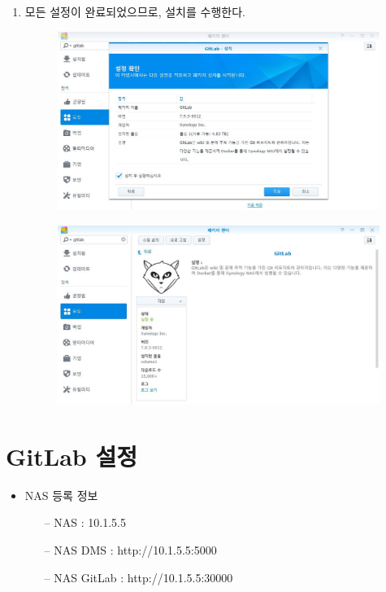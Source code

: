 \documentclass[11pt
  , a4paper
  , article
  , oneside
]{memoir}
\begin{document}
\begin{enumerate}
\item 모든 설정이 완료되었으므로, 설치를 수행한다.
\begin{figure}[h!]
	\centering
	\includegraphics[width=0.99\textwidth]{./images/7.JPG}
\end{figure}

\begin{figure}[h!]
	\centering
	\includegraphics[width=0.99\textwidth]{./images/8.JPG}
\end{figure}
\end{enumerate}
\clearpage

\chapter{GitLab 설정}
\begin{itemize}
\item NAS 등록 정보
	\begin{itemize}
		\item[--] NAS : 10.1.5.5
		\item[--] NAS DMS : http://10.1.5.5:5000 
		\item[--] NAS GitLab : http://10.1.5.5:30000
	\end{itemize}
\end{itemize}
\end{document}
